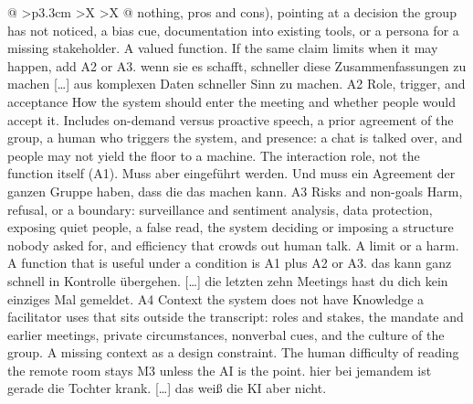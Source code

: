 \begin{xltabular}{\textwidth}{@{}
    >{\RaggedRight\arraybackslash}p{3.3cm}
    >{\RaggedRight\arraybackslash}X
    >{\RaggedRight\arraybackslash}X
  @{}}
{    nothing, pros and cons), pointing at a decision the group has not noticed, a bias cue,
  documentation into existing tools, or a persona for a missing stakeholder.}
  {A valued function. If the same claim limits when it may happen, add A2 or A3.}
  {wenn sie es schafft, schneller diese Zusammenfassungen zu machen [\ldots] aus komplexen
  Daten schneller Sinn zu machen.}
  \cbgap
  \cbrow
  {A2}
  {Role, trigger, and acceptance}
  {How the system should enter the meeting and whether people would accept it. Includes
    on-demand versus proactive speech, a prior agreement of the group, a human who triggers
    the system, and presence: a chat is talked over, and people may not yield the floor to a
  machine.}
  {The interaction role, not the function itself (A1).}
  {Muss aber eingeführt werden. Und muss ein Agreement der ganzen Gruppe haben, dass die das
  machen kann.}
  \cbgap
  \cbrow
  {A3}
  {Risks and non-goals}
  {Harm, refusal, or a boundary: surveillance and sentiment analysis, data protection,
    exposing quiet people, a false read, the system deciding or imposing a structure nobody
  asked for, and efficiency that crowds out human talk.}
  {A limit or a harm. A function that is useful under a condition is A1 plus A2 or A3.}
  {das kann ganz schnell in Kontrolle übergehen. [\ldots] die letzten zehn Meetings hast du
  dich kein einziges Mal gemeldet.}
  \cbgap
  \cbrow
  {A4}
  {Context the system does not have}
  {Knowledge a facilitator uses that sits outside the transcript: roles and stakes, the
    mandate and earlier meetings, private circumstances, nonverbal cues, and the culture of
  the group.}
  {A missing context as a design constraint. The human difficulty of reading the remote room
  stays M3 unless the AI is the point.}
  {hier bei jemandem ist gerade die Tochter krank. [\ldots] das weiß die KI aber nicht.}
\end{xltabular}
\endgroup
